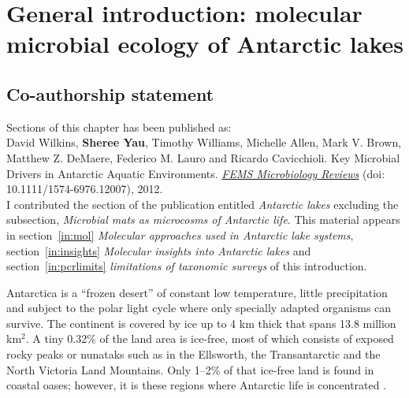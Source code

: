 \chapter[General introduction]{General introduction: molecular microbial ecology of Antarctic lakes}
\label{ch:intro}


\section*{Co-authorship statement}

Sections of this chapter has been published as:\\

David Wilkins, \textbf{Sheree Yau}, Timothy Williams, Michelle Allen, Mark V. Brown, Matthew Z. DeMaere, Federico M. Lauro and Ricardo Cavicchioli. 
Key Microbial Drivers in Antarctic Aquatic Environments.
\textit{\underline{FEMS Microbiology Reviews}} 
(doi: 10.1111/1574-6976.12007), 2012.\\

I contributed the section of the publication entitled \emph{Antarctic lakes} excluding the subsection, \emph{Microbial mats as microcosms of Antarctic life}.
This material appears in section~\ref{in:mol} \emph{Molecular approaches used in Antarctic lake systems}, section~\ref{in:insights} \emph{Molecular insights into Antarctic lakes} and section~\ref{in:pcrlimits} \emph{limitations of taxonomic surveys} of this introduction.
\newpage


Antarctica is a ``frozen desert'' of constant low temperature, little precipitation and subject to the polar light cycle where only specially adapted organisms can survive.
The continent is covered by ice up to 4 km thick that spans 13.8 million km$^2$.
A tiny 0.32\% of the land area is ice-free, most of which consists of exposed rocky peaks or nunataks such as in the Ellsworth, the Transantarctic and the North Victoria Land Mountains. %
Only 1--2\% of that ice-free land is found in coastal oases; however, it is these regions where Antarctic life is concentrated \cite{Hodgson2012}.


